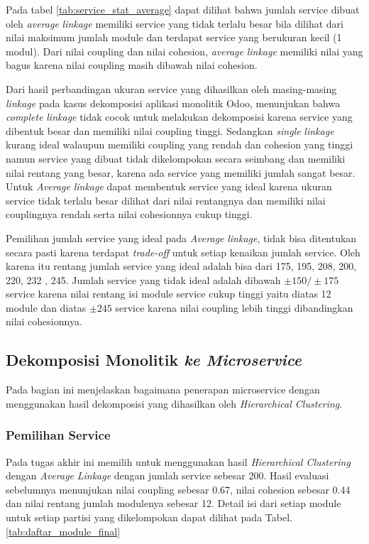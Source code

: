 Pada tabel \ref{tab:service_stat_average} dapat dilihat bahwa jumlah service dibuat oleh \textit{average} \textit{linkage} memiliki service yang tidak terlalu besar bila dilihat dari nilai maksimum jumlah module dan terdapat service yang berukuran kecil (1 modul). Dari nilai coupling dan nilai cohesion, \textit{average} \textit{linkage} memiliki nilai yang bagus karena nilai coupling masih dibawah nilai cohesion. 

Dari hasil perbandingan ukuran service yang dihasilkan oleh masing-masing \textit{linkage} pada kasus dekomposisi aplikasi monolitik Odoo, menunjukan bahwa \textit{complete} \textit{linkage} tidak cocok untuk melakukan dekomposisi karena service yang dibentuk besar dan memiliki nilai coupling tinggi. Sedangkan \textit{single} \textit{linkage} kurang ideal walaupun memiliki coupling yang rendah dan cohesion yang tinggi namun service yang dibuat tidak dikelompokan secara seimbang dan memiliki nilai rentang yang besar, karena ada service yang memiliki jumlah sangat besar. Untuk \textit{Average} \textit{linkage} dapat membentuk service yang ideal karena ukuran service tidak terlalu besar dilihat dari nilai rentangnya dan memiliki nilai couplingnya rendah serta nilai cohesionnya cukup tinggi. 

Pemilihan jumlah service yang ideal pada \textit{Average} \textit{linkage}, tidak bisa ditentukan secara pasti karena terdapat \textit{trade-off} untuk setiap kenaikan jumlah service. Oleh karena itu rentang jumlah service yang ideal adalah bisa dari 175, 195, 208, 200, 220, 232 , 245. Jumlah service yang tidak ideal adalah dibawah $\pm 150 / \pm 175$ service karena nilai rentang isi module service cukup tinggi yaitu diatas 12 module dan diatas $\pm 245$ service karena nilai coupling lebih tinggi dibandingkan nilai cohesionnya. \\

\pagebreak

\subsection{Dekomposisi Monolitik \textit{ ke Microservice}}
Pada bagian ini menjelaskan bagaimana penerapan microservice dengan menggunakan hasil dekomposisi yang dihasilkan oleh \textit{Hierarchical Clustering}. 

\subsubsection{Pemilihan Service}
Pada tugas akhir ini memilih untuk menggunakan hasil \textit{Hierarchical Clustering} dengan \textit{Average} \textit{Linkage} dengan jumlah service sebesar 200. Hasil evaluasi sebelumnya menunjukan nilai coupling sebesar 0.67, nilai cohesion sebesar 0.44 dan nilai rentang jumlah modulenya sebesar 12. Detail isi dari setiap module untuk setiap partisi yang dikelompokan dapat dilihat pada Tabel. \ref{tab:daftar_module_final} 

